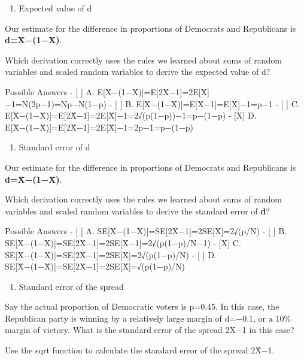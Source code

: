 \documentclass[
]{article}
\providecommand{\tightlist}{%
  \setlength{\itemsep}{0pt}\setlength{\parskip}{0pt}}
\begin{document}
\begin{enumerate}
\def\labelenumi{\arabic{enumi}.}
\setcounter{enumi}{6}
\tightlist
\item
  Expected value of d
\end{enumerate}

Our estimate for the difference in proportions of Democrats and
Republicans is \textbf{d=X̄−(1−X̄)}.

Which derivation correctly uses the rules we learned about sums of
random variables and scaled random variables to derive the expected
value of d?

Possible Answers - {[} {]} A.
E{[}X̄−(1−X̄){]}=E{[}2X̄−1{]}=2E{[}X̄{]}−1=N(2p−1)=Np−N(1−p) - {[} {]} B.
E{[}X̄−(1−X̄){]}=E{[}X̄−1{]}=E{[}X̄{]}−1=p−1 - {[} {]} C.
E{[}X̄−(1−X̄){]}=E{[}2X̄−1{]}=2E{[}X̄{]}−1=2√(p(1−p))−1=p−(1−p) - {[}X{]} D.
E{[}X̄−(1−X̄){]}=E{[}2X̄−1{]}=2E{[}X̄{]}−1=2p−1=p−(1−p)

\begin{enumerate}
\def\labelenumi{\arabic{enumi}.}
\setcounter{enumi}{7}
\tightlist
\item
  Standard error of d
\end{enumerate}

Our estimate for the difference in proportions of Democrats and
Republicans is \textbf{d=X̄−(1−X̄)}.

Which derivation correctly uses the rules we learned about sums of
random variables and scaled random variables to derive the standard
error of \textbf{d}?

Possible Answers - {[} {]} A.
SE{[}X̄−(1−X̄){]}=SE{[}2X̄−1{]}=2SE{[}X̄{]}=2√(p/N) - {[} {]} B.
SE{[}X̄−(1−X̄){]}=SE{[}2X̄−1{]}=2SE{[}X̄−1{]}=2√(p(1−p)/N−1) - {[}X{]} C.
SE{[}X̄−(1−X̄){]}=SE{[}2X̄−1{]}=2SE{[}X̄{]}=2√(p(1−p)/N) - {[} {]} D.
SE{[}X̄−(1−X̄){]}=SE{[}2X̄−1{]}=2SE{[}X̄{]}=√(p(1−p)/N)

\begin{enumerate}
\def\labelenumi{\arabic{enumi}.}
\setcounter{enumi}{8}
\tightlist
\item
  Standard error of the spread
\end{enumerate}

Say the actual proportion of Democratic voters is p=0.45. In this case,
the Republican party is winning by a relatively large margin of d=−0.1,
or a 10\% margin of victory. What is the standard error of the spread
2X̄−1 in this case?

Use the sqrt function to calculate the standard error of the spread
2X̄−1.
\end{document}
